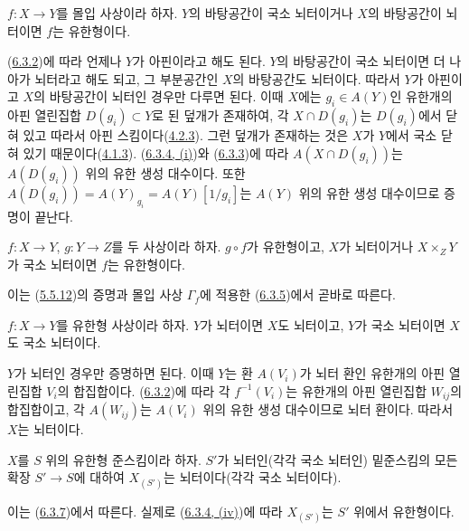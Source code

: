 \begin{corollary}[6.3.5]
\label{I.6.3.5-ko}
$f:X\to Y$를 몰입 사상이라 하자. $Y$의 바탕공간이 국소 뇌터이거나
$X$의 바탕공간이 뇌터이면 $f$는 유한형이다.
\end{corollary}

(\hyperref[I.6.3.2-ko]{6.3.2})에 따라 언제나 $Y$가 아핀이라고 해도
된다. $Y$의 바탕공간이 국소 뇌터이면 더 나아가 뇌터라고 해도 되고,
그 부분공간인 $X$의 바탕공간도 뇌터이다. 따라서 $Y$가 아핀이고
$X$의 바탕공간이 뇌터인 경우만 다루면 된다. 이때 $X$에는
$g_i\in A(Y)$인 유한개의 아핀 열린집합 $D(g_i)\subset Y$로 된 덮개가
존재하여, 각 $X\cap D(g_i)$는 $D(g_i)$에서 닫혀 있고 따라서 아핀
스킴이다(\hyperref[I.4.2.3-ko]{4.2.3}). 그런 덮개가 존재하는 것은 $X$가
$Y$에서 국소 닫혀 있기 때문이다(\hyperref[I.4.1.3-ko]{4.1.3}).
(\hyperref[I.6.3.4-ko]{6.3.4, (i)})와
(\hyperref[I.6.3.3-ko]{6.3.3})에 따라 $A(X\cap D(g_i))$는
$A(D(g_i))$ 위의 유한 생성 대수이다. 또한
$A(D(g_i))=A(Y)_{g_i}=A(Y)[1/g_i]$는 $A(Y)$ 위의 유한 생성 대수이므로
증명이 끝난다.

\begin{corollary}[6.3.6]
\label{I.6.3.6-ko}
$f:X\to Y$, $g:Y\to Z$를 두 사상이라 하자. $g\circ f$가 유한형이고,
$X$가 뇌터이거나 $X\times_Z Y$가 국소 뇌터이면 $f$는 유한형이다.
\end{corollary}

이는 (\hyperref[I.5.5.12-ko]{5.5.12})의 증명과 몰입 사상
$\Gamma_f$에 적용한 (\hyperref[I.6.3.5-ko]{6.3.5})에서 곧바로 따른다.

\begin{proposition}[6.3.7]
\label{I.6.3.7-ko}
$f:X\to Y$를 유한형 사상이라 하자. $Y$가 뇌터이면 $X$도 뇌터이고,
$Y$가 국소 뇌터이면 $X$도 국소 뇌터이다.
\end{proposition}

$Y$가 뇌터인 경우만 증명하면 된다. 이때 $Y$는 환 $A(V_i)$가 뇌터
환인 유한개의 아핀 열린집합 $V_i$의 합집합이다.
(\hyperref[I.6.3.2-ko]{6.3.2})에 따라 각 $f^{-1}(V_i)$는 유한개의
아핀 열린집합 $W_{ij}$의 합집합이고, 각 $A(W_{ij})$는 $A(V_i)$ 위의
유한 생성 대수이므로 뇌터 환이다. 따라서 $X$는 뇌터이다.

\begin{corollary}[6.3.8]
\label{I.6.3.8-ko}
$X$를 $S$ 위의 유한형 준스킴이라 하자. $S'$가 뇌터인(각각 국소
뇌터인) 밑준스킴의 모든 확장 $S'\to S$에 대하여 $X_{(S')}$는
뇌터이다(각각 국소 뇌터이다).
\end{corollary}

이는 (\hyperref[I.6.3.7-ko]{6.3.7})에서 따른다. 실제로
(\hyperref[I.6.3.4-ko]{6.3.4, (iv)})에 따라 $X_{(S')}$는 $S'$ 위에서
유한형이다.

